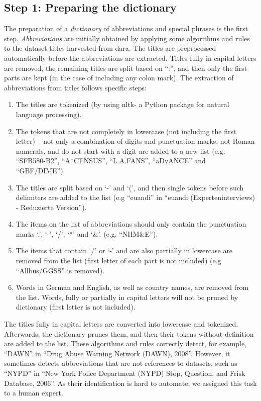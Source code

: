 \documentclass{IOS-Book-Article}
\newcommand{\dara}{\textsf{da\textbar ra}}
\begin{document}
\subsection{Step 1: Preparing the dictionary}
\label{sec:preparing-dictionary}
The preparation of a \emph{dictionary} of abbreviations and special phrases is the first step. \emph{Abbreviations} are initially obtained by applying some algorithms and rules to the dataset titles harvested from {\dara}.
The titles are preprocessed automatically before the abbreviations are extracted. Titles fully in capital letters are removed, the remaining titles are split based on \enquote{:}, and then only the first parts are kept (in the case of including any colon mark).
The extraction of abbreviations from titles follows specific steps:

\begin{enumerate}
	\item The titles are tokenized (by using nltk- a Python package for natural language processing).
	\item The tokens that are not completely in lowercase (not including the first letter) -- not only a combination of digits and punctuation marks, not Roman numerals, and do not start with a digit are added to a new list (e.g. \enquote{SFB580-B2}, \enquote{A*CENSUS}, \enquote{L.A.FANS}, \enquote{aDvANCE}
	and \enquote{GBF/DIME}).
	\item The titles are split based on `-' and `(', and then single tokens before such delimiters are added to the list (e.g \enquote{euandi} in \enquote{euandi (Experteninterviews) - Reduzierte Version}).
	\item The items on the list of abbreviations should only contain the punctuation marks `.', `-', `/', `*' and `\&'. (e.g. \enquote{NHM\&E}).
	\item The items that contain `/' or `-' and are also partially in lowercase are removed from the list (first letter of each part is not included) (e.g \enquote{Allbus/GGSS} is removed). 
	\item Words in German and English, as well as country names, are removed from the list. Words, fully or partially in capital letters will not be pruned by dictionary (first letter is not included).
\end{enumerate}
The titles fully in capital letters are converted into lowercase and tokenized. Afterwards, the dictionary prunes them, and then their tokens without definition are added to the list.
These algorithms and rules correctly detect, for example, \enquote{DAWN} in \enquote{Drug Abuse Warning Network (DAWN), 2008}. However, it sometimes detects abbreviations that are not references to datasets, such as \enquote{NYPD} in \enquote{New York Police Department (NYPD) Stop, Question, and Frisk Database, 2006}. As their identification is hard to automate, we assigned this task to a human expert. 
\end{document}
